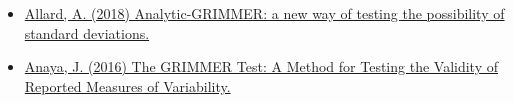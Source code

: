\documentclass[letterpaper, 12pt]{article}
\begin{document}
{

\begin{itemize}
    \item \href{https://aurelienallard.netlify.app/post/anaytic-grimmer-possibility-standard-deviations/}{Allard, A. (2018) Analytic-GRIMMER: a new way of testing the possibility of standard deviations.}

    \item \href{https://peerj.com/preprints/2400/}{Anaya, J. (2016) The GRIMMER Test: A Method for Testing the Validity of Reported Measures of Variability.}


\end{itemize}}
\end{document}
